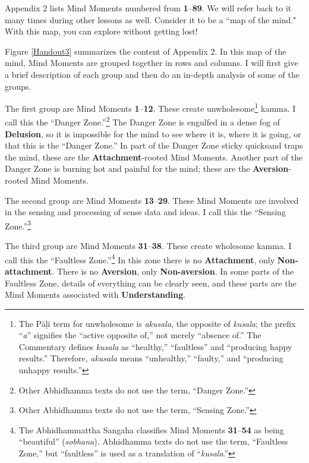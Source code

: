 Appendix 2 lists Mind Moments numbered from \textbf{1}--\textbf{89}. We will refer back to it many times during other lessons as well. Consider it to be a ``map of the mind." With this map, you can explore without getting lost! 

Figure \ref{Handout3} summarizes the content of Appendix 2. In this map of the mind, Mind Moments are grouped together in rows and columns. I will first give a brief description of each group and then do an in-depth analysis of some of the groups.

\pagebreak

The first group are Mind Moments \textbf{1}--\textbf{12}. These create unwholesome\footnote{The Pāḷi term for unwholesome is \textit{akusala}, the opposite of \textit{kusala}; the prefix “\textit{a}” signifies the “active opposite of,” not merely “absence of.” The Commentary defines \textit{kusala} as “healthy,” “faultless” and “producing happy results.” Therefore, \textit{akusala} means “unhealthy,” “faulty,” and “producing unhappy results.”} kamma. I call this the “Danger Zone.”\footnote{Other Abhidhamma texts do not use the term, “Danger Zone.”} The Danger Zone is engulfed in a dense fog of \textbf{Delusion}, so it is impossible for the mind to see where it is, where it is going, or that this is the “Danger Zone.” In part of the Danger Zone sticky quicksand traps the mind, these are the \textbf{Attachment}-rooted Mind Moments. Another part of the Danger Zone is burning hot and painful for the mind; these are the \textbf{Aversion}-rooted Mind Moments.

The second group are Mind Moments \textbf{13}--\textbf{29}. These Mind Moments are involved in the sensing and processing of sense data and ideas. I call this the “Sensing Zone.”\footnote{Other Abhidhamma texts do not use the term, “Sensing Zone.”}

The third group are Mind Moments \textbf{31}--\textbf{38}. These create wholesome kamma. I call this the “Faultless Zone.”\footnote{The Abhidhammattha Sangaha classifies Mind Moments \textbf{31}--\textbf{54} as being “beautiful” (\textit{sobhana}). Abhidhamma texts do not use the term, “Faultless Zone,” but “faultless” is used as a translation of “\textit{kusala}.”} In this zone there is no \textbf{Attachment}, only \textbf{Non-attachment}. There is no \textbf{Aversion}, only \textbf{Non-aversion}. In some parts of the Faultless Zone, details of everything can be clearly seen, and these parts are the Mind Moments associated with \textbf{Understanding}.

